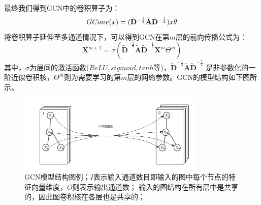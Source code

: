   最终我们得到GCN\textsuperscript{\cite{kipfGCN}}中的卷积算子为：
  \begin{equation} \label{gcn_conv_4}
    GConv(\mathnormal{x}) = 
    (\tilde{\mathbf{D}}^{-\frac{1}{2}} \tilde{\mathbf{A}} \tilde{\mathbf{D}}^{-\frac{1}{2}})
    \mathnormal{x}
    \theta
  \end{equation}
  将卷积算子延伸至多通道情况下，可以得到GCN在第$m$层的前向传播公式为：
  \begin{equation} \label{gcn_forward}
    \mathbf{X}^{m+1} = \sigma(
      \tilde{\mathbf{D}}^{-\frac{1}{2}} \tilde{\mathbf{A}} \tilde{\mathbf{D}}^{-\frac{1}{2}}
      \mathbf{X}^{m}\Theta^{m}
      )
  \end{equation}
  其中，$\sigma$为层间的激活函数($ReLU, sigmoid, tanh$等)，$ \tilde{\mathbf{D}}^{-\frac{1}{2}} \tilde{\mathbf{A}} \tilde{\mathbf{D}}^{-\frac{1}{2}}$
  是非参数化的一阶近似卷积核，$\Theta^{m}$则为需要学习的第$m$层的网络参数。GCN的模型结构如下图所示。
  \begin{figure}[htbp]
    \centering
    \includegraphics[width=0.8\textwidth]{Figures/GCN-model.png}
    \caption{GCN模型结构图例；$I$表示输入通道数目即输入的图中每个节点的特征向量维度，$O$则表示输出通道数；
    输入的图结构在所有层中是共享的，因此图卷积核在各层也是共享的；}
    \label{pic:GCN-model}
  \end{figure}
  
